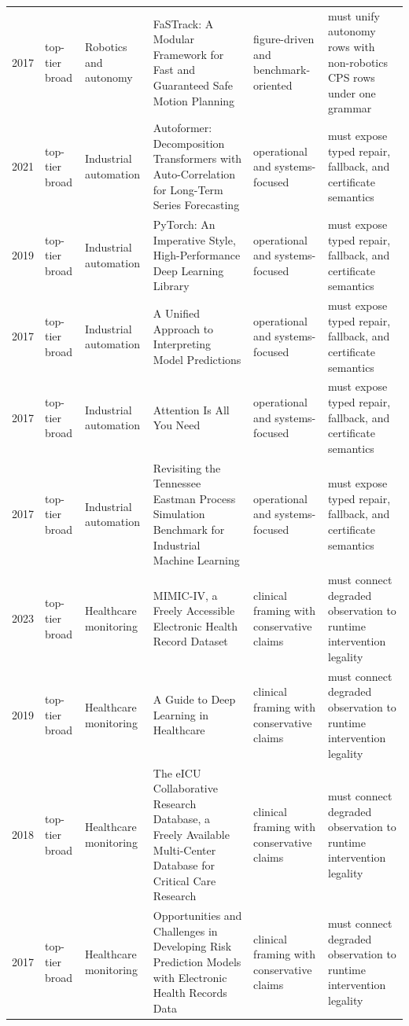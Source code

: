 \begin{longtable}{p{}p{}p{}p{}p{}p{}}
2017 & top-tier broad & Robotics and autonomy & FaSTrack: A Modular Framework for Fast and Guaranteed Safe Motion Planning & figure-driven and benchmark-oriented & must unify autonomy rows with non-robotics CPS rows under one grammar\\
2021 & top-tier broad & Industrial automation & Autoformer: Decomposition Transformers with Auto-Correlation for Long-Term Series Forecasting & operational and systems-focused & must expose typed repair, fallback, and certificate semantics\\
2019 & top-tier broad & Industrial automation & PyTorch: An Imperative Style, High-Performance Deep Learning Library & operational and systems-focused & must expose typed repair, fallback, and certificate semantics\\
2017 & top-tier broad & Industrial automation & A Unified Approach to Interpreting Model Predictions & operational and systems-focused & must expose typed repair, fallback, and certificate semantics\\
2017 & top-tier broad & Industrial automation & Attention Is All You Need & operational and systems-focused & must expose typed repair, fallback, and certificate semantics\\
2017 & top-tier broad & Industrial automation & Revisiting the Tennessee Eastman Process Simulation Benchmark for Industrial Machine Learning & operational and systems-focused & must expose typed repair, fallback, and certificate semantics\\
2023 & top-tier broad & Healthcare monitoring & MIMIC-IV, a Freely Accessible Electronic Health Record Dataset & clinical framing with conservative claims & must connect degraded observation to runtime intervention legality\\
2019 & top-tier broad & Healthcare monitoring & A Guide to Deep Learning in Healthcare & clinical framing with conservative claims & must connect degraded observation to runtime intervention legality\\
2018 & top-tier broad & Healthcare monitoring & The eICU Collaborative Research Database, a Freely Available Multi-Center Database for Critical Care Research & clinical framing with conservative claims & must connect degraded observation to runtime intervention legality\\
2017 & top-tier broad & Healthcare monitoring & Opportunities and Challenges in Developing Risk Prediction Models with Electronic Health Records Data & clinical framing with conservative claims & must connect degraded observation to runtime intervention legality\\

\end{longtable}
